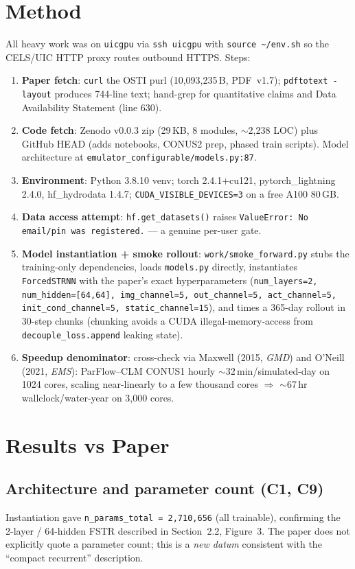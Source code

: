 \documentclass[11pt,letterpaper]{article}
\begin{document}
\section{Method}
All heavy work was on \texttt{uicgpu} via \texttt{ssh uicgpu} with \texttt{source \~{}/env.sh} so the CELS/UIC HTTP proxy routes outbound HTTPS. Steps:

\begin{enumerate}
  \item \textbf{Paper fetch}: \texttt{curl} the OSTI purl (10{,}093{,}235\,B, PDF~v1.7); \texttt{pdftotext -layout} produces 744-line text; hand-grep for quantitative claims and Data Availability Statement (line 630).
  \item \textbf{Code fetch}: Zenodo v0.0.3 zip (29\,KB, 8 modules, $\sim$2{,}238 LOC) plus GitHub HEAD (adds notebooks, CONUS2 prep, phased train scripts). Model architecture at \texttt{emulator\_configurable/models.py:87}.
  \item \textbf{Environment}: Python 3.8.10 venv; torch 2.4.1+cu121, pytorch\_lightning 2.4.0, hf\_hydrodata 1.4.7; \texttt{CUDA\_VISIBLE\_DEVICES=3} on a free A100 80\,GB.
  \item \textbf{Data access attempt}: \texttt{hf.get\_datasets()} raises \texttt{ValueError: No email/pin was registered.} --- a genuine per-user gate.
  \item \textbf{Model instantiation + smoke rollout}: \texttt{work/smoke\_forward.py} stubs the training-only dependencies, loads \texttt{models.py} directly, instantiates \texttt{ForcedSTRNN} with the paper's exact hyperparameters (\texttt{num\_layers=2, num\_hidden=[64,64], img\_channel=5, out\_channel=5, act\_channel=5, init\_cond\_channel=5, static\_channel=15}), and times a 365-day rollout in 30-step chunks (chunking avoids a CUDA illegal-memory-access from \texttt{decouple\_loss.append} leaking state).
  \item \textbf{Speedup denominator}: cross-check via Maxwell (2015, \emph{GMD}) and O'Neill (2021, \emph{EMS}): ParFlow--CLM CONUS1 hourly $\sim$32\,min/simulated-day on 1024 cores, scaling near-linearly to a few thousand cores $\Rightarrow$ $\sim$67\,hr wallclock/water-year on 3{,}000 cores.
\end{enumerate}

\section{Results vs Paper}

\subsection{Architecture and parameter count (C1, C9)}
Instantiation gave \texttt{n\_params\_total = 2{,}710{,}656} (all trainable), confirming the 2-layer / 64-hidden FSTR described in Section~2.2, Figure~3. The paper does not explicitly quote a parameter count; this is a \emph{new datum} consistent with the ``compact recurrent'' description.
\end{document}
